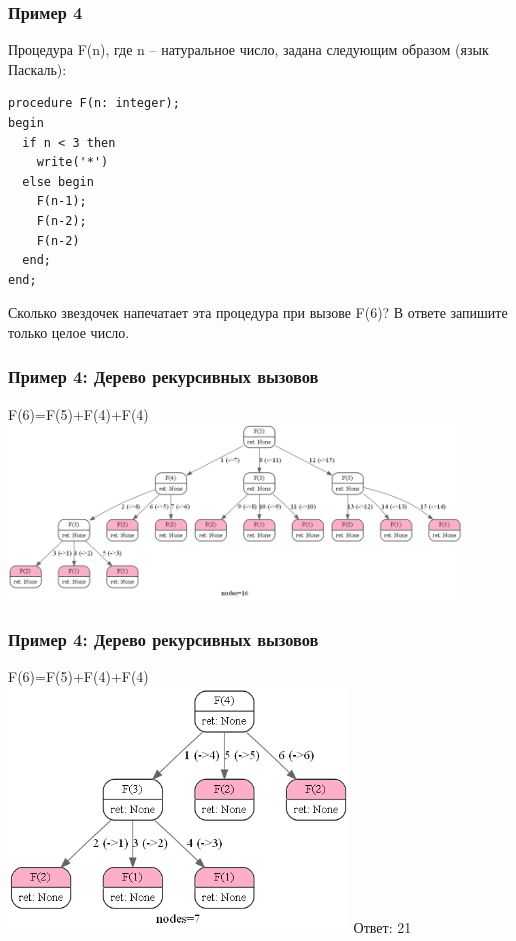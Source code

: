 \begin{frame}[fragile]
\frametitle{Пример 4}

Процедура F(n), где n – натуральное число, задана следующим образом (язык Паскаль):
\begin{lstlisting}[style=CStyle]
procedure F(n: integer);
begin
  if n < 3 then
    write('*')
  else begin
    F(n-1);
    F(n-2);
    F(n-2)
  end;
end;
\end{lstlisting}
Сколько звездочек напечатает эта процедура при вызове F(6)? В ответе запишите только целое число.

\end{frame}

\begin{frame}[fragile]
\frametitle{Пример 4: Дерево рекурсивных вызовов}
F(6)=F(5)+F(4)+F(4)\\
\includegraphics[width=12cm, center]{images/rec04.png}
\end{frame}

\begin{frame}[fragile]
\frametitle{Пример 4: Дерево рекурсивных вызовов}
F(6)=F(5)+F(4)+F(4)\\
\includegraphics[height=6.5cm, center]{images/rec041.png}
\pause Ответ: 21
\end{frame}